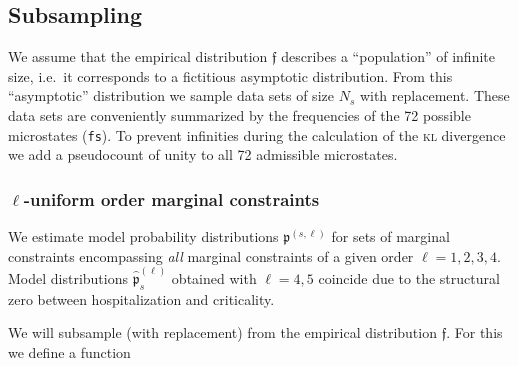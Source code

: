 \documentclass[
]{article}
\newcommand{\prob}[1]{\mathfrak{#1}}
\newcommand{\maxentP}{\hat{\prob p}}
\begin{document}
\hypertarget{subsampling}{%
\subsection{Subsampling}\label{subsampling}}

We assume that the empirical distribution \(\prob f\) describes a
``population'' of infinite size, i.e.~it corresponds to a fictitious
asymptotic distribution. From this ``asymptotic'' distribution we sample
data sets of size \(N_s\) with replacement. These data sets are
conveniently summarized by the frequencies of the 72 possible
microstates (\texttt{fs}). To prevent infinities during the calculation
of the \textsc{kl} divergence we add a pseudocount of unity to all 72
admissible microstates.

\hypertarget{ell-uniform-order-marginal-constraints}{%
\subsubsection{\texorpdfstring{\(\ell\)-uniform order marginal
constraints}{\textbackslash ell-uniform order marginal constraints}}\label{ell-uniform-order-marginal-constraints}}

We estimate model probability distributions \(\prob p^{(s,\ell)}\) for
sets of marginal constraints encompassing \emph{all} marginal
constraints of a given order \(\ell = 1,2,3,4\). Model distributions
\(\maxentP_{s}^{(\ell)}\) obtained with \(\ell=4,5\) coincide due to the
structural zero between hospitalization and criticality.

We will subsample (with replacement) from the empirical distribution
\(\prob f\). For this we define a function
\end{document}

